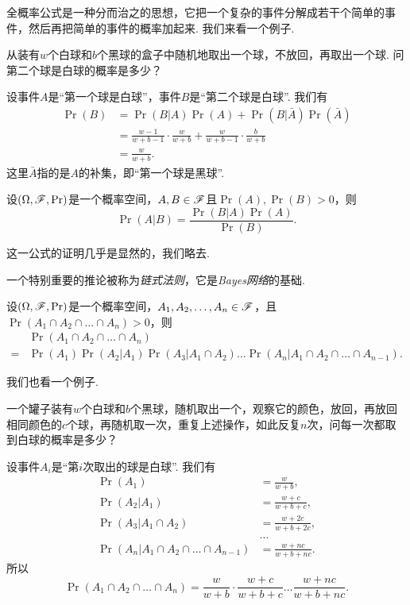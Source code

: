 全概率公式是一种分而治之的思想，它把一个复杂的事件分解成若干个简单的事件，然后再把简单的事件的概率加起来. 我们来看一个例子. 

\begin{example}
    从装有$w$个白球和$b$个黑球的盒子中随机地取出一个球，不放回，再取出一个球. 问第二个球是白球的概率是多少？

    设事件$A$是“第一个球是白球”，事件$B$是“第二个球是白球”. 我们有
\begin{align*}
    \Pr(B) &= \Pr(B|A)\Pr(A) + \Pr(B|\bar{A})\Pr(\bar{A}) \\
    &=\frac{w-1}{w+b-1}\cdot\frac{w}{w+b} + \frac{w}{w+b-1}\cdot\frac{b}{w+b}\\
    &=\frac{w}{w+b}.
\end{align*}
    这里$\bar A$指的是$A$的补集，即“第一个球是黑球”. 
\end{example}

\begin{theorem}[贝叶斯公式]\label{theorem:bayes}
设$(\Omega,\mathscr{F},\Pr)$是一个概率空间，$A,B\in\mathscr{F}$且$\Pr(A),\Pr(B)>0$，则
\[
    \Pr(A|B) = \frac{\Pr(B|A)\Pr(A)}{\Pr(B)}.
\]
\end{theorem}

这一公式的证明几乎是显然的，我们略去. 

一个特别重要的推论被称为\textit{链式法则}，它是\textit{Bayes网络}的基础. 

\begin{corollary}[链式法则]\label{corollary:chain-rule}
设$(\Omega,\mathscr{F},\Pr)$是一个概率空间，$A_1,A_2,\ldots,A_n\in\mathscr{F}$，且$\Pr(A_1\cap A_2\cap\dots\cap A_n)>0$，则
\begin{align*}
    &\Pr(A_1\cap A_2\cap\dots\cap A_n)\\
    = &\Pr(A_1)\Pr(A_2|A_1)\Pr(A_3|A_1\cap A_2)\dots\Pr(A_n|A_1\cap A_2\cap\dots\cap A_{n-1}).
\end{align*}
\end{corollary}

我们也看一个例子. 

\begin{example}[P\'olya的罐子]
    一个罐子装有$w$个白球和$b$个黑球，随机取出一个，观察它的颜色，放回，再放回相同颜色的$c$个球，再随机取一次，重复上述操作，如此反复$n$次，问每一次都取到白球的概率是多少？

    设事件$A_i$是“第$i$次取出的球是白球”. 我们有
\begin{align*}
    \Pr(A_1)&=\frac{w}{w+b},\\
    \Pr(A_2|A_1)&=\frac{w+c}{w+b+c},\\
    \Pr(A_3|A_1\cap A_2)&=\frac{w+2c}{w+b+2c},\\
    &\dots\\
    \Pr(A_n|A_1\cap A_2\cap\dots\cap A_{n-1})&=\frac{w+nc}{w+b+nc}.
\end{align*}
    所以
\[
    \Pr(A_1\cap A_2\cap\dots\cap A_n) = \frac{w}{w+b}\cdot\frac{w+c}{w+b+c}\dots\frac{w+nc}{w+b+nc}.
\]
\end{example}

